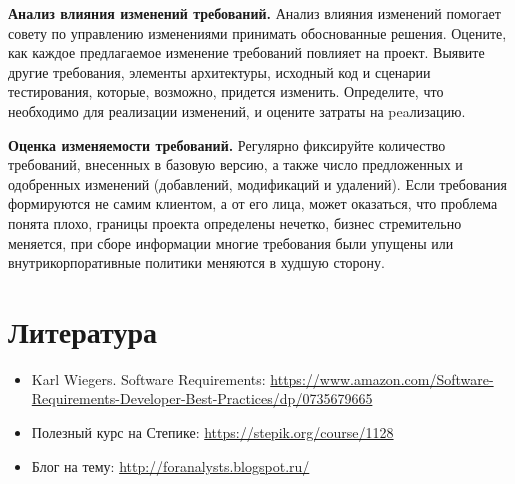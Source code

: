 \documentclass{../../text-style}
\begin{document}
\textbf{Анализ влияния изменений требований.} Анализ влияния изменений помогает совету по управлению изменениями принимать обоснованные решения. Оцените, как каждое предлагаемое изменение требований повлияет на проект. Выявите другие требования, элементы архитектуры, исходный код и сценарии тестирования, которые, возможно, придется изменить. Определите, что необходимо для реализации изменений, и оцените затраты на peaлизацию.

\textbf{Оценка изменяемости требований.} Регулярно фиксируйте количество требований, внесенных в базовую версию, а также число предложенных и одобренных изменений (добавлений, модификаций и удалений). Если требования формируются не самим клиентом, а от его лица, может оказаться, что проблема понята плохо, границы проекта определены нечетко, бизнес стремительно меняется, при сборе информации многие требования были упущены или внутрикорпоративные политики меняются в худшую сторону.

\section{Литература}

\begin{itemize}
    \item Karl Wiegers. Software Requirements: \url{https://www.amazon.com/Software-Requirements-Developer-Best-Practices/dp/0735679665}
    \item Полезный курс на Степике: \url{https://stepik.org/course/1128}
    \item Блог на тему: \url{http://foranalysts.blogspot.ru/}
\end{itemize}
\end{document}
